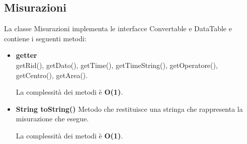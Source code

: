\documentclass[a4paper, 12pt]{scrreprt}
\begin{document}
			\subsection{Misurazioni}
			La classe Misurazioni implementa le interfacce Convertable e DataTable e contiene i seguenti metodi:\\
			\begin{itemize}
				\item \textbf{getter}
				\\getRid(), getDato(), getTime(), getTimeString(), getOperatore(), getCentro(), getArea().
				
				La complessit\`a dei metodi è \textbf{O(1)}.
				
				\item \textbf{String toString()}
				Metodo che restituisce una stringa che rappresenta la misurazione che esegue.
				
				La complessit\`a dei metodi è \textbf{O(1)}.
				
			\end{itemize}
\end{document}
